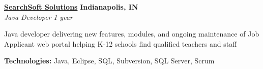 %
    \headerrow
        {\textbf{\href{http://www.searchsoft.net/}{SearchSoft Solutions}}}
        {\textbf{Indianapolis, IN}}
    \\
    \headerrow
        {\emph{Java Developer}}
        {\emph{1 year}}
    \begin{itemize*}
        \item Java developer delivering new features, modules, and ongoing maintenance of Job Applicant web portal
            helping K-12 schools find qualified teachers and staff
    \end{itemize*}

    \hspace{1.0em}
    \textbf{Technologies:} Java, Eclipse, SQL, Subversion, SQL Server, Scrum
